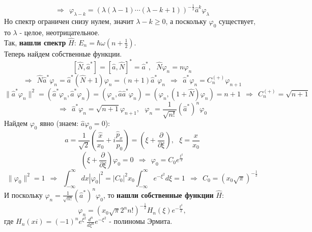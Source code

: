 			$$
				\Rightarrow \ \ \varphi_{\lambda - k} = (\lambda(\lambda - 1)\cdots (\lambda - k + 1))^{-\frac{1}{2}}\hat{a}^k\varphi_{\lambda}
			$$
			Но спектр ограничен снизу нулем, значит $\lambda-k\ge0$, а поскольку $\varphi_0$ существует, то $\lambda$ - целое, неотрицательное.\\
			Так, \textbf{нашли спектр} $\hat{H}$: $E_n = \hbar\omega\left(n+\frac{1}{2}\right)$.\\
			Теперь найдем собственные функции.\\
			$$
				\left[\hat{N},\hat{a}^{*}\right]=\left[\hat{a},\hat{N}\right]^{*}=\hat{a}^{*}, \ \ \ \hat{N}\varphi_n=n\varphi_n
			$$
			$$
				\Rightarrow \ \ \hat{N}\hat{a}^{*}\varphi_n = \hat{a}^{*}(\hat{N}+1)\varphi_n = (n+1)\hat{a}^{*}\varphi_n \ \ \Rightarrow \ \ \hat{a}^{*}\varphi_n=C_n^{(+)}\varphi_{n+1}
			$$
			$$
				\|\hat{a}^{*}\varphi_n\|^2=(\hat{a}^{*}\varphi_n,\hat{a}^{*}\varphi_n)=(\varphi_n,\hat{a}\hat{a}^{*}\varphi_n) = (\varphi_n, (1+\hat{N})\varphi_n)=n+1 \ \ \Rightarrow \ \ C_n^{(+)} = \sqrt{n+1}
			$$
			$$
				\Rightarrow \ \ \hat{a}^{*}\varphi_n=\sqrt{n+1}\varphi_{n+1}, \ \ \ \varphi_n = \frac{1}{\sqrt{n!}}(\hat{a}^{*})^n\varphi_0
			$$
			Найдем $\varphi_0$ явно (знаем: $\hat{a}\varphi_0=0$):
			$$
				\hat{a} = \frac{1}{\sqrt{2}}\left(\frac{\hat{x}}{x_0} + i\frac{\hat{p}_x}{p_0}\right) = \left(\xi +\frac{\partial}{\partial \xi}\right), \ \ \ \xi = \frac{x}{x_0}
			$$
			$$
				\left(\xi +\frac{\partial}{\partial \xi}\right)\varphi_0=0 \ \ \Rightarrow \ \ \varphi_0 = C_0e^{\frac{\xi^2}{2}}
			$$
			$$
				\|\varphi_0\|^2 = 1 \ \ \Rightarrow \ \ \int_{-\infty}^{\infty}dx|\varphi_0|^2 = |C_0|^2x_0\int_{-\infty}^{\infty}e^{-\xi^2}d\xi = 1 \ \ \Rightarrow \ \ C_0 = (x_0\sqrt{\pi})^{-\frac{1}{2}}
			$$
			И поскольку $\varphi_n = \frac{1}{\sqrt{n!}}(\hat{a}^{*})^n\varphi_0$, то \textbf{нашли собственные функции} $\hat{H}$:
			$$
				\varphi_n = (x_0\sqrt{\pi}2^nn!)^{-\frac{1}{2}}H_n(\xi)e^{-\frac{\xi^2}{2}}, 
			$$
			где $H_n(xi) = (-1)^ne^{\xi^2}\frac{d^n}{d\xi^n}e^{-\xi^2}$ - полиномы Эрмита.
